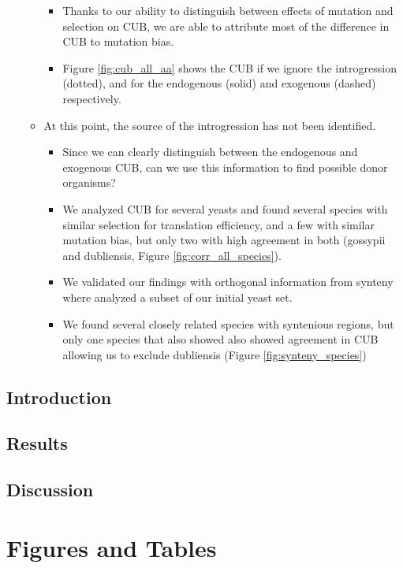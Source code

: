 \documentclass[12pt]{article}
\begin{document}
\begin{itemize}
\begin{itemize}
\begin{itemize}
			\item Thanks to our ability to distinguish between effects of mutation and selection on CUB, we are able to attribute most of the difference in CUB to mutation bias.
			\item Figure \ref{fig:cub_all_aa} shows the CUB if we ignore the introgression (dotted), and for the endogenous (solid) and exogenous (dashed) respectively.
		\end{itemize}
		\item At this point, the source of the introgression has not been identified.
		\begin{itemize}
			\item Since we can clearly distinguish between the endogenous and exogenous CUB, can we use this information to find possible donor organisms?
			\item We analyzed CUB for several yeasts and found several species with similar selection for translation efficiency, and a few with similar mutation bias, but only two with high agreement in both (gossypii and dubliensis, Figure \ref{fig:corr_all_species}).
			\item We validated our findings with orthogonal information from synteny where analyzed a subset of our initial yeast set.
			\item We found several closely related species with syntenious regions, but only one species that also showed also showed agreement in CUB allowing us to exclude dubliensis (Figure \ref{fig:synteny_species})
		\end{itemize}
	\end{itemize}
\end{itemize}

\subsection*{Introduction}

\subsection*{Results}

\subsection*{Discussion}






\section*{Figures and Tables}
\end{document}
